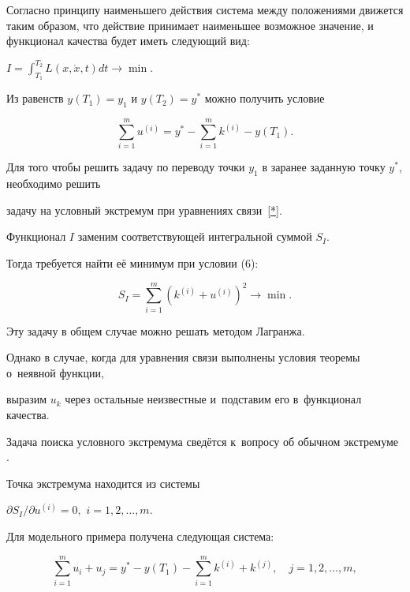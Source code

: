 Согласно принципу наименьшего действия система между положениями движется таким образом, что действие принимает наименьшее возможное значение, и функционал качества будет иметь следующий вид:

$ \displaystyle

I=\int_{ T_1 }^{ T_2 } L(x, \dot {x}, t) dt \to \min.

$

Из равенств $y(T_1 )=y_1$ и $y(T_2 )=y^\ast $ можно получить условие

\begin{equation}

\label{*}

\sum_{i=1}^m u^{(i)} = y^\ast -\sum_{i=1}^m {k^{(i)} } -y(T_1).

\end{equation}

Для того чтобы решить задачу по переводу точки $ y_1 $ в заранее заданную точку $ y^*$, необходимо решить

задачу на условный экстремум при уравнениях связи~\eqref{*}.



Функционал $I$ заменим соответствующей интегральной суммой $S_I$.

Тогда требуется найти её минимум при условии (6):

$$

S_I=\sum_{i=1}^m (k^{(i)} +u^{(i)})^2 \to \min.

$$

Эту задачу в общем случае можно решать методом Лагранжа\cite{kaledin_sukharev:VMA}.

Однако в случае, когда для уравнения связи выполнены условия теоремы о~неявной функции,

выразим $u_k$ через остальные неизвестные и~подставим его в~функционал качества.

Задача поиска условного экстремума сведётся к~вопросу об обычном экстремуме \cite{kaledin_sukharev:NSB}.

Точка экстремума находится из системы

$\partial S_I/\partial u^{(i)} =0,$ $i= 1, 2, \dots, m$.





Для модельного примера получена следующая система:

\begin{equation} \label{**}

\sum_{i=1}^m u_i +u_j = y^* - y(T_1) - \sum_{i=1}^m k^{(i)} + k^{(j)}, \quad j= 1, 2, \dots, m,

\end{equation}

